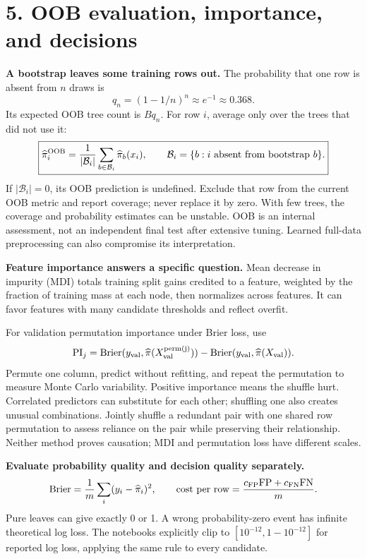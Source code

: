 \documentclass[11pt,a4paper]{article}
\begin{document}
\section*{5. OOB evaluation, importance, and decisions}
\textbf{A bootstrap leaves some training rows out.}
The probability that one row is absent from $n$ draws is
\[
q_n=(1-1/n)^n\approx e^{-1}\approx0.368.
\]
Its expected OOB tree count is $Bq_n$. For row $i$, average only over the
trees that did not use it:
\[
\boxed{\widehat\pi_i^{\rm OOB}
=\frac1{|\mathcal B_i|}\sum_{b\in\mathcal B_i}\widehat\pi_b(x_i),\qquad
\mathcal B_i=\{b:i\text{ absent from bootstrap }b\}.}
\]
If $|\mathcal B_i|=0$, its OOB prediction is undefined. Exclude that row from
the current OOB metric and report coverage; never replace it by zero.
With few trees, the coverage and probability estimates can be unstable.
OOB is an internal assessment, not an independent final test after extensive
tuning. Learned full-data preprocessing can also compromise its interpretation.

\textbf{Feature importance answers a specific question.}
Mean decrease in impurity (MDI) totals training split gains credited to a feature,
weighted by the fraction of training mass at each node, then normalizes across
features. It can favor features with many candidate thresholds and reflect overfit.

For validation permutation importance under Brier loss, use
\[
\operatorname{PI}_j=
\operatorname{Brier}(y_{\rm val},\widehat\pi(X_{\rm val}^{\rm perm(j)}))
-\operatorname{Brier}(y_{\rm val},\widehat\pi(X_{\rm val})).
\]
Permute one column, predict without refitting, and repeat the permutation to
measure Monte Carlo variability. Positive importance means the shuffle hurt.
Correlated predictors can substitute for each other; shuffling one also creates
unusual combinations. Jointly shuffle a redundant pair with one shared row
permutation to assess reliance on the pair while preserving their relationship.
Neither method proves causation; MDI and permutation loss have different scales.

\textbf{Evaluate probability quality and decision quality separately.}
\[
\operatorname{Brier}=\frac1m\sum_i(y_i-\widehat\pi_i)^2,\qquad
\text{cost per row}=\frac{c_{\rm FP}\mathrm{FP}+c_{\rm FN}\mathrm{FN}}m.
\]
Pure leaves can give exactly 0 or 1. A wrong probability-zero event has infinite
theoretical log loss. The notebooks explicitly clip to $[10^{-12},1-10^{-12}]$
for reported log loss, applying the same rule to every candidate.
\end{document}
